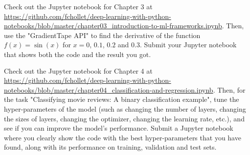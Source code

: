 \documentclass[11pt]{article}
\begin{document}
\makeAssignmentTitle

\begin{homeworkProblem}
    Check out the Jupyter notebook for Chapter 3 at \url{https://github.com/fchollet/deep-learning-with-python-notebooks/blob/master/chapter03_introduction-to-ml-frameworks.ipynb}.
    Then, use the "GradientTape API" to find the derivative of the function
    $f(x) = \sin(x)$ for $x = 0$, $0.1$, $0.2$ and $0.3$. Submit your Jupyter notebook
    that shows both the code and the result you got. \\

    \solution

\end{homeworkProblem}

\pagebreak

\begin{homeworkProblem}
    Check out the Jupyter notebook for Chapter 4 at \url{https://github.com/fchollet/deep-learning-with-python-notebooks/blob/master/chapter04_classification-and-regression.ipynb}.
    Then, for the task "Classifying movie reviews: A binary classification example", tune the
    hyper-parameters of the model (such as changing the number of layers, changing the sizes of layers,
    changing the optimizer, changing the learning rate, etc.), and see if you can improve the model's
    performance. Submit a Jupyter notebook where you clearly show the code with the best hyper-parameters
    that you have found, along with its performance on training, validation and test sets. \\

    \solution
\end{homeworkProblem}
\end{document}

